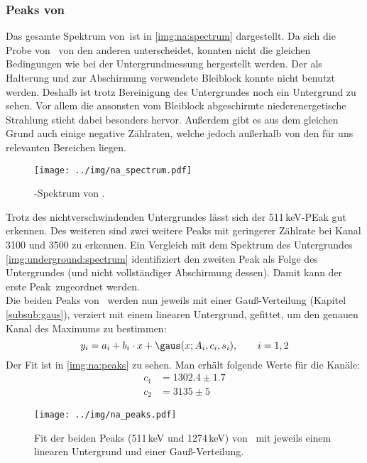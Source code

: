 \subsubsection{Peaks von \na}
\label{subsub:eval:na}
Das gesamte Spektrum von \na\,ist in \autoref{img:na:spectrum} dargestellt. Da sich die Probe von \na\, von den anderen unterscheidet, konnten nicht die 
gleichen Bedingungen wie bei der Untergrundmessung hergestellt werden. Der als Halterung und zur Abschirmung verwendete Bleiblock konnte nicht 
benutzt werden. Deshalb ist trotz Bereinigung des Untergrundes noch ein Untergrund zu sehen. Vor allem die ansonsten vom Bleiblock abgeschirmte 
niederenergetische Strahlung sticht dabei besonders hervor. Außerdem gibt es aus dem gleichen Grund auch einige negative Zählraten, welche jedoch 
außerhalb von den für uns relevanten Bereichen liegen.
\begin{figure}[H]
\begin{center}
  \texttt{[image: ../img/na\_spectrum.pdf]}
  \caption{\textgamma-Spektrum von .}
  \label{img:na:spectrum}
\end{center}
\end{figure}
Trotz des nichtverschwindenden Untergrundes lässt sich der 511\,keV-PEak gut erkennen. Des weiteren sind zwei weitere Peaks mit geringerer 
Zählrate bei Kanal 3100 und 3500 zu erkennen. Ein Vergleich mit dem Spektrum des Untergrundes \autoref{img:underground:spectrum} identifiziert 
den zweiten Peak als Folge des Untergrundes (und nicht vollständiger Abschirmung dessen). Damit kann der erste Peak \na\,zugeordnet werden.\\[\baselineskip]
Die beiden Peaks von \na\, werden nun jeweils mit einer Gauß-Verteilung (Kapitel \ref{subsub:gaus}), verziert mit einem linearen Untergrund, 
gefittet, um den genauen Kanal des Maximums zu bestimmen:
\begin{equation}
  y_i = a_i + b_i \cdot x + \gaus(x; A_i, c_i, s_i), \qquad i = 1, 2
\end{equation}
Der Fit ist in \autoref{img:na:peaks} zu sehen. Man erhält folgende Werte für die Kanäle:
\begin{equation}
\begin{split}
  \label{eq:na:channels}
  c_1 &= 1302.4  \pm 1.7 \\
  c_2 &= 3135  \pm 5 
\end{split}
\end{equation}
\begin{figure}[H]
\begin{center}
  \texttt{[image: ../img/na\_peaks.pdf]}
  \caption{Fit der beiden Peaks (511\,keV und 1274\,keV) von \na\, mit jeweils einem linearen Untergrund und einer Gauß-Verteilung.}
  \label{img:na:peaks}
\end{center}
\end{figure}

